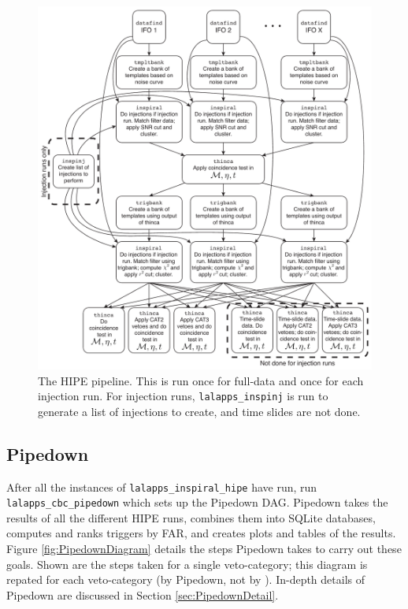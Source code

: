 \begin{figure}[p]
\begin{center}
\includegraphics[width=6in]{figures/HIPEDiagram.pdf}
\end{center}
\caption{
The \ac{HIPE} pipeline. This is run once for full-data and once for
each injection run. For injection runs, \texttt{lalapps\_inspinj} is run to
generate a list of injections to create, and time slides are not done.
}
\label{fig:HIPEDiagram}
\end{figure}

\subsection{Pipedown}

After all the instances of \texttt{lalapps\_inspiral\_hipe} have run, \ihope
run \texttt{lalapps\_cbc\_pipedown} which sets up the Pipedown \ac{DAG}.
Pipedown takes the results of all the different HIPE runs, combines them into
SQLite databases, computes and ranks triggers by \ac{FAR}, and creates plots
and tables of the results. Figure \ref{fig:PipedownDiagram} details the steps
Pipedown takes to carry out these goals. Shown are the steps taken for a single
veto-category; this diagram is repated for each veto-category (by Pipedown, not
by \ihope). In-depth details of Pipedown are discussed in Section
\ref{sec:PipedownDetail}.

